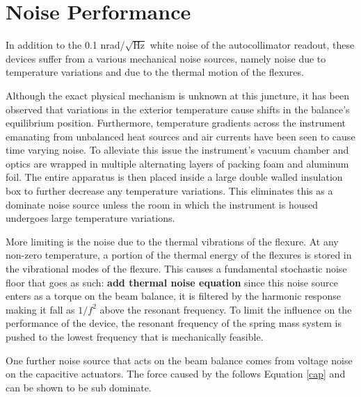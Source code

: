 \documentclass [12pt, proquest]{uwthesis}[2019]
\begin{document}
\section{Noise Performance}

In addition to the 0.1 nrad/$\sqrt{\text{Hz}}$ white noise of the autocollimator readout, these devices suffer from a various mechanical noise sources, namely noise due to temperature variations and due to the thermal motion of the flexures.

Although the exact physical mechanism is unknown at this juncture, it has been observed that variations in the exterior temperature cause shifts in the balance's equilibrium position. Furthermore, temperature gradients across the instrument emanating from unbalanced heat sources and air currents have been seen to cause time varying noise. To alleviate this issue the instrument's vacuum chamber and optics are wrapped in multiple alternating layers of packing foam and aluminum foil. The entire apparatus is then placed inside a large double walled insulation box to further decrease any temperature variations. This eliminates this as a dominate noise source unless the room in which the instrument is housed undergoes large temperature variations.

More limiting is the noise due to the thermal vibrations of the flexure. At any non-zero temperature, a portion of the thermal energy of the flexures is stored in the vibrational modes of the flexure. This causes a fundamental stochastic noise floor that goes as such:
\textbf{add thermal noise equation}
 since this noise source enters as a torque on the beam balance, it is filtered by the harmonic response making it fall as $1/f^2$ above the resonant frequency. To limit the influence on the performance of the device, the resonant frequency of the spring mass system is pushed to the lowest frequency that is mechanically feasible. 
 
 One further noise source that acts on the beam balance comes from voltage noise on the capacitive actuators. The force caused by the follows Equation \ref{cap} and can be shown to be sub dominate.
 
\end{document}
